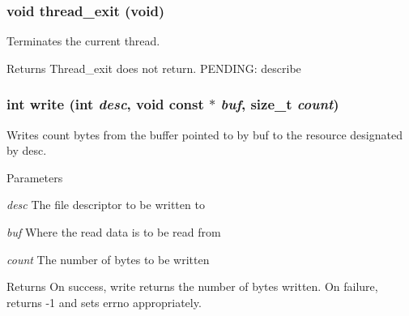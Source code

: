 \hypertarget{group__syscalls_ga87c2438941819bb3cc31658aa9eb66fe}{
\subsubsection[{thread\_\-exit}]{\setlength{\rightskip}{0pt plus 5cm}void thread\_\-exit (void)}}
\label{group__syscalls_ga87c2438941819bb3cc31658aa9eb66fe}
Terminates the current thread. \begin{DoxyReturn}{Returns}
Thread\_\-exit does not return. PENDING: describe 
\end{DoxyReturn}
\hypertarget{group__syscalls_ga3b0897fd20782dd7792b88d189e9d4df}{
\subsubsection[{write}]{\setlength{\rightskip}{0pt plus 5cm}int write (int {\em desc}, \/  void const $\ast$ {\em buf}, \/  size\_\-t {\em count})}}
\label{group__syscalls_ga3b0897fd20782dd7792b88d189e9d4df}
Writes count bytes from the buffer pointed to by buf to the resource designated by desc. 
\begin{DoxyParams}{Parameters}
\item[{\em desc}]The file descriptor to be written to \item[{\em buf}]Where the read data is to be read from \item[{\em count}]The number of bytes to be written \end{DoxyParams}
\begin{DoxyReturn}{Returns}
On success, write returns the number of bytes written. On failure, returns -\/1 and sets errno appropriately. 
\end{DoxyReturn}
